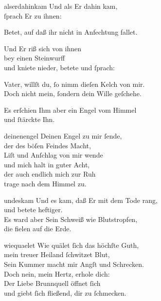 \documentclass[tocstyle=ref-genre]{ees}
\begin{document}
{\begin{movement}{alserdahinkam}
  \voice[Evangelist]
  Und als Er dahin kam,\\
  ſprach Er zu ihnen:

  \voice[Jesus]
  Betet, auf daß ihr nicht in Anfechtung fallet.

  \voice[Evangelist]
  Und Er riß sich von ihnen\\
  bey einen Steinwurff\\
  und kniete nieder, betete und ſprach:

  \voice[Jesus]
  Vater, willſt du, ſo nimm dieſen Kelch von mir.\\
  Doch nicht mein, ſondern dein Wille geſchehe.

  \voice[Evangelist]
  Es erſchien Ihm aber ein Engel vom Himmel\\
  und ſtärckte Ihn.
\end{movement}

\begin{movement}{deinenengel}
  \voice[Chor]
  Deinen Engel zu mir ſende,\\
  der des böſen Feindes Macht,\\
  Liſt und Anſchlag von mir wende\\
  und mich halt in guter Acht,\\
  der auch endlich mich zur Ruh\\
  trage nach dem Himmel zu.
\end{movement}

\begin{movement}{undeskam}
  \voice[Evangelist]
  Und es kam, daß Er mit dem Tode rang,\\
  und betete heftiger.\\
  Es ward aber Sein Schweiß wie Blutstropfen,\\
  die fielen auf die Erde.
\end{movement}

\begin{movement}{wiequaelet}
  \voice[Soprano]
  Wie quälet ſich das höchſte Guth,\\
  mein treuer Heiland ſchwitzet Blut,\\
  Sein Kummer macht mir Angſt und Schrecken.\\
  Doch nein, mein Hertz, erhole dich:\\
  Der Liebe Brunnquell öffnet ſich\\
  und giebt ſich fließend, dir zu ſchmecken.
\end{movement}

}
\end{document}
